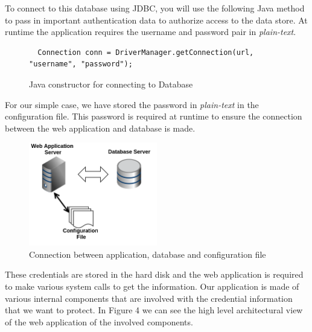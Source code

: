 \documentclass[11pt, a4paper, twoside, openright, notitlepage]{report}
\begin{document}
To connect to this database using JDBC, you will use the following Java method to pass in important authentication data to authorize access to the data store. At runtime the application requires the username and password pair in \emph{plain-text}. 


\begin{figure}[!ht]
\begin{lstlisting}
  Connection conn = DriverManager.getConnection(url, "username", "password");
\end{lstlisting} 
\caption{Java constructor for connecting to Database}
\end{figure}

For our simple case, we have stored the password in \emph{plain-text} in the configuration file. This password is required at runtime to ensure the connection between the web application and database is made. \\

\begin{figure}[!ht]
    \centering
    \includegraphics[width=0.5\textwidth]{config}
    \caption{Connection between application, database and configuration file}
\end{figure}

These credentials are stored in the hard disk and the web application is required to make various system calls to get the information. Our application is made of various internal components that are involved with the credential  information that we want to protect. In Figure 4 we can see the high level architectural view of the web application of the involved components. 
\end{document}
